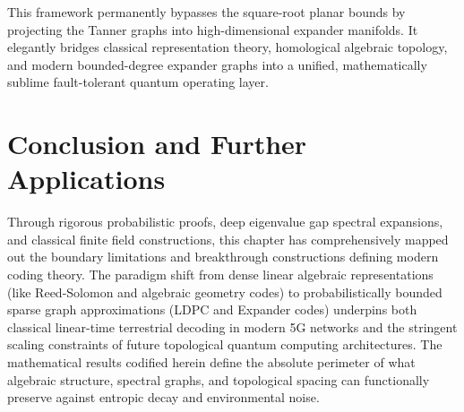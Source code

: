 This framework permanently bypasses the square-root planar bounds by projecting the Tanner graphs into high-dimensional expander manifolds. It elegantly bridges classical representation theory, homological algebraic topology, and modern bounded-degree expander graphs into a unified, mathematically sublime fault-tolerant quantum operating layer.

\section{Conclusion and Further Applications}

Through rigorous probabilistic proofs, deep eigenvalue gap spectral expansions, and classical finite field constructions, this chapter has comprehensively mapped out the boundary limitations and breakthrough constructions defining modern coding theory. The paradigm shift from dense linear algebraic representations (like Reed-Solomon and algebraic geometry codes) to probabilistically bounded sparse graph approximations (LDPC and Expander codes) underpins both classical linear-time terrestrial decoding in modern 5G networks and the stringent scaling constraints of future topological quantum computing architectures. The mathematical results codified herein define the absolute perimeter of what algebraic structure, spectral graphs, and topological spacing can functionally preserve against entropic decay and environmental noise.
